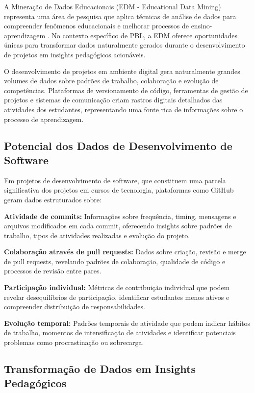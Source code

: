 \documentclass[english, spanish, brazilian]{RBIEarticle} %
\begin{document}
A Mineração de Dados Educacionais (EDM - Educational Data Mining) representa uma área de pesquisa que aplica técnicas de análise de dados para compreender fenômenos educacionais e melhorar processos de ensino-aprendizagem \cite{Baker2011}. No contexto específico de PBL, a EDM oferece oportunidades únicas para transformar dados naturalmente gerados durante o desenvolvimento de projetos em insights pedagógicos acionáveis.

O desenvolvimento de projetos em ambiente digital gera naturalmente grandes volumes de dados sobre padrões de trabalho, colaboração e evolução de competências. Plataformas de versionamento de código, ferramentas de gestão de projetos e sistemas de comunicação criam rastros digitais detalhados das atividades dos estudantes, representando uma fonte rica de informações sobre o processo de aprendizagem.

\subsection{Potencial dos Dados de Desenvolvimento de Software}

Em projetos de desenvolvimento de software, que constituem uma parcela significativa dos projetos em cursos de tecnologia, plataformas como GitHub geram dados estruturados sobre:

\textbf{Atividade de commits:} Informações sobre frequência, timing, mensagens e arquivos modificados em cada commit, oferecendo insights sobre padrões de trabalho, tipos de atividades realizadas e evolução do projeto.

\textbf{Colaboração através de pull requests:} Dados sobre criação, revisão e merge de pull requests, revelando padrões de colaboração, qualidade de código e processos de revisão entre pares.

\textbf{Participação individual:} Métricas de contribuição individual que podem revelar desequilíbrios de participação, identificar estudantes menos ativos e compreender distribuição de responsabilidades.

\textbf{Evolução temporal:} Padrões temporais de atividade que podem indicar hábitos de trabalho, momentos de intensificação de atividades e identificar potenciais problemas como procrastinação ou sobrecarga.

\subsection{Transformação de Dados em Insights Pedagógicos}
\end{document}
